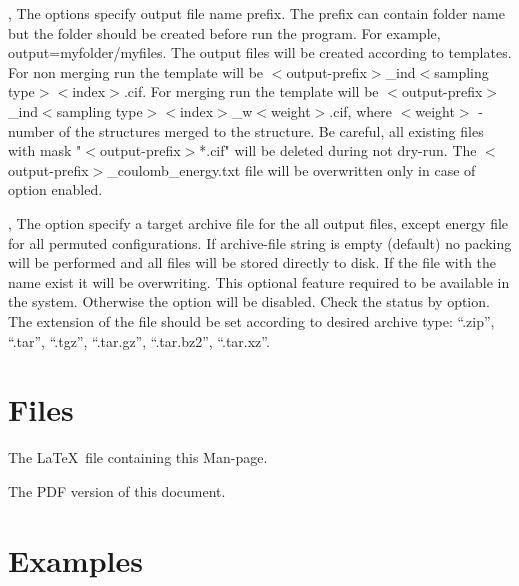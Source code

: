 \documentclass[a4paper,english]{article}
\begin{document}
\begin{Description}
\item[\OptArg{-o }{output-prefix}, \OptArg{\Dd output=}{output-prefix}]
      The options specify output file name prefix. The prefix can contain folder name but the folder should be created before run the program. For example, \Dd output=myfolder/myfiles. The output files will be created according to templates. For non merging run the template will be $<$output-prefix$>$\_ind$<$sampling type$><$index$>$.cif. For merging run the template will be $<$output-prefix$>$\_ind$<$sampling type$><$index$>$\_w$<$weight$>$.cif, where $<$weight$>$ - number of the structures merged to the structure. Be careful, all existing files with mask "$<$output-prefix$>$*.cif" will be deleted during not dry-run. The $<$output-prefix$>$\_coulomb\_energy.txt file will be overwritten only in case of  option enabled.
      
\item[\OptArg{-a }{archive-file}, \OptArg{\Dd archive=}{archive-file}]
      The option specify a target archive file for the all output files, except energy file for all permuted configurations. If archive-file string is empty (default) no packing will be performed and all files will be stored directly to disk. If the file with the name exist it will be overwriting. This optional feature required  to be available in the system. Otherwise the option will be disabled. Check the status by  option. The extension of the file should be set according to desired archive type: ``.zip'', ``.tar'', ``.tgz'', ``.tar.gz'', ``.tar.bz2'', ``.tar.xz''.

\end{Description}

\section{Files}

\begin{Description}\setlength{\itemsep}{0cm}
\item[\File{somthing}] The \LaTeX\ file containing this Man-page.
\item[\URL{1.pdf}] The PDF version of this document.
\end{Description}

\section{Examples}
\end{document}
